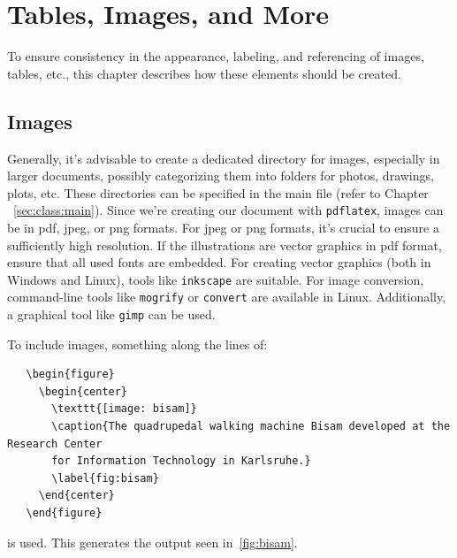 \chapter{Tables, Images, and More}
\label{chap:floats}
To ensure consistency in the appearance, labeling, and referencing of images, tables, etc., this chapter describes how these elements should be created.

\section{Images}
\label{sec:floats:images}
 Generally, it's advisable to create a dedicated directory for images, especially in larger documents, possibly categorizing them into folders for photos, drawings, plots, etc. These directories can be specified in the main file (refer to Chapter ~\ref{sec:class:main}). Since we're creating our document with \texttt{pdflatex}, images can be in pdf, jpeg, or png formats. For jpeg or png formats, it's crucial to ensure a sufficiently high resolution. If the illustrations are vector graphics in pdf format, ensure that all used fonts are embedded. For creating vector graphics (both in Windows and Linux), tools like \texttt{inkscape} are suitable. For image conversion, command-line tools like \texttt{mogrify} or \texttt{convert} are available in Linux. Additionally, a graphical tool like \texttt{gimp} can be used. 


To include images, something along the lines of:
\begin{verbatim}
   \begin{figure}
     \begin{center}
       \texttt{[image: bisam]}
       \caption{The quadrupedal walking machine Bisam developed at the Research Center
       for Information Technology in Karlsruhe.}
       \label{fig:bisam}
     \end{center}
   \end{figure}
\end{verbatim}
is used. This generates the output seen in~\ref{fig:bisam}.

